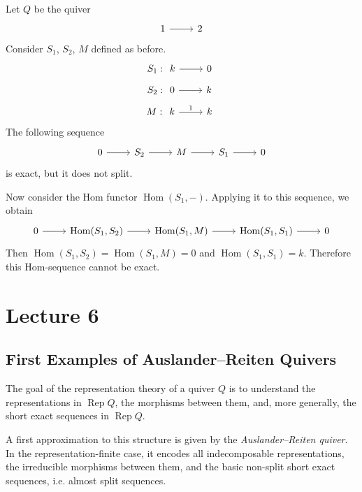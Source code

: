 \documentclass[11pt, a4paper]{report}
\begin{document}
\begin{example}
    Let $Q$ be the quiver
    \[
        \begin{tikzcd}
            1 \arrow[r] & 2
        \end{tikzcd}
    \]
    Consider $S_1$, $S_2$, $M$ defined as before.
    \[
        S_1: \begin{tikzcd}
            k \arrow[r] & 0
        \end{tikzcd}
    \]
    \[
        S_2: \begin{tikzcd}
            0 \arrow[r] & k
        \end{tikzcd}
    \]
    \[
        M: \begin{tikzcd}
            k \arrow[r,"1"] & k
        \end{tikzcd}
    \]
    The following sequence
    \[
        \begin{tikzcd}
            0 \arrow[r] & S_2 \arrow[r] & M \arrow[r] & S_1 \arrow[r] & 0
        \end{tikzcd}
    \]
    is exact, but it does not split.

    Now consider the Hom functor $\operatorname{Hom}(S_1,-)$. Applying it to this sequence, we obtain
    \[
        \begin{tikzcd}
            0 \arrow[r] & {\operatorname{Hom}(S_1,S_2)} \arrow[r] & {\operatorname{Hom}(S_1,M)} \arrow[r] & {\operatorname{Hom}(S_1,S_1)} \arrow[r] & 0
        \end{tikzcd}
    \]
    Then $\operatorname{Hom}(S_1,S_2)=\operatorname{Hom}(S_1,M)=0$ and $\operatorname{Hom}(S_1,S_1)=k$. Therefore this Hom-sequence cannot be exact.
\end{example}

\chapter{Lecture 6}


\section{First Examples of Auslander--Reiten Quivers}

The goal of the representation theory of a quiver $Q$ is to understand the
representations in $\operatorname{Rep}Q$, the morphisms between them, and, more generally,
the short exact sequences in $\operatorname{Rep}Q$.

A first approximation to this structure is given by the \emph{Auslander--Reiten
    quiver}. In the representation-finite case, it encodes all indecomposable
representations, the irreducible morphisms between them, and the basic non-split short exact sequences, i.e. almost split sequences.
\end{document}
